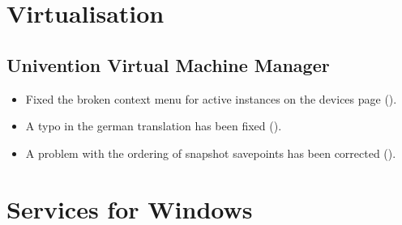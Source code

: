 \section{Virtualisation}


\subsection{Univention Virtual Machine Manager}
\begin{itemize}
\item Fixed the broken context menu for active instances on the
  devices page ().
\item A typo in the german translation has been fixed
  ().
\item A problem with the ordering of snapshot savepoints has been
  corrected ().
\end{itemize}






\section{Services for Windows}

